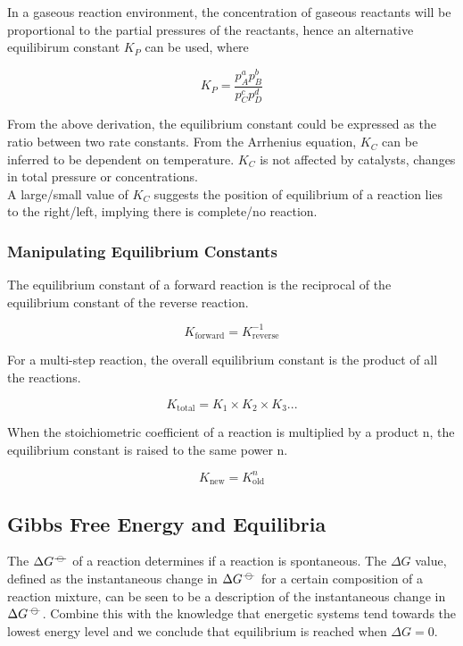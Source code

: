 \documentclass[../main]{subfiles}
\begin{document}

	In a gaseous reaction environment, the concentration of gaseous reactants will be proportional to the partial pressures of the reactants, hence an alternative equilibirum constant \(K_P\) can be used, where

	\[ K_P = \frac{p_A^a p_B^b}{p_C^c p_D^d} \]

	From the above derivation, the equilibrium constant could be expressed as the ratio between two rate constants. From the Arrhenius equation, \(K_C\) can be inferred to be dependent on temperature. \(K_C\) is not affected by catalysts, changes in total pressure or concentrations. \\

	A large/small value of \(K_C\) suggests the position of equilibrium of a reaction lies to the right/left, implying there is complete/no reaction.

	\subsubsection{Manipulating Equilibrium Constants}

	The equilibrium constant of a forward reaction is the reciprocal of the equilibrium constant of the reverse reaction.

	\[ K_\text{forward} = K_\text{reverse}^{-1} \]

	For a multi-step reaction, the overall equilibrium constant is the product of all the reactions.

	\[ K_\text{total} = K_1 \times K_2 \times K_3 ... \]

	When the stoichiometric coefficient of a reaction is multiplied by a product n, the equilibrium constant is raised to the same power n.

	\[ K_\text{new} = K_\text{old}^n\]

	\subsection{Gibbs Free Energy and Equilibria}

	The \(\Delta G^{-\kern-4pt{\ominus}\kern-4pt-}\) of a reaction determines if a reaction is spontaneous. The \(\Delta G\) value, defined as the instantaneous change in \(\Delta G^{-\kern-4pt{\ominus}\kern-4pt-}\) for a certain composition of a reaction mixture, can be seen to be a description of the instantaneous change in \(\Delta G^{-\kern-4pt{\ominus}\kern-4pt-}\). Combine this with the knowledge that energetic systems tend towards the lowest energy level and we conclude that equilibrium is reached when \(\Delta G = 0\). \\
\end{document}
